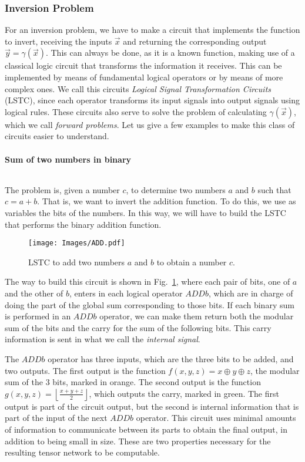 \subsubsection{Inversion Problem}
For an inversion problem, we have to make a circuit that implements the function to invert, receiving the inputs $\vec{x}$ and returning the corresponding output $\vec{y} = \gamma(\vec{x})$. This can always be done, as it is a known function, making use of a classical logic circuit that transforms the information it receives. This can be implemented by means of fundamental logical operators or by means of more complex ones. We call this circuits \textit{Logical Signal Transformation Circuits} (LSTC), since each operator transforms its input signals into output signals using logical rules. These circuits also serve to solve the problem of calculating $\gamma(\vec{x})$, which we call \textit{forward problems}. Let us give a few examples to make this class of circuits easier to understand.

\paragraph{Sum of two numbers in binary}
$ $

The problem is, given a number $c$, to determine two numbers $a$ and $b$ such that $c=a+b$. That is, we want to invert the addition function. To do this, we use as variables the bits of the numbers. In this way, we will have to build the LSTC that performs the binary addition function.
\begin{figure}[h]
    \centering
    \texttt{[image: Images/ADD.pdf]}
    \caption{LSTC to add two numbers $a$ and $b$ to obtain a number $c$.}
    \label{fig: ADD circuit}
\end{figure}

The way to build this circuit is shown in Fig.~\ref{fig: ADD circuit}, where each pair of bits, one of $a$ and the other of $b$, enters in each logical operator $ADDb$, which are in charge of doing the part of the global sum corresponding to those bits. If each binary sum is performed in an $ADDb$ operator, we can make them return both the modular sum of the bits and the carry for the sum of the following bits. This carry information is sent in what we call the \textit{internal signal}.

The $ADDb$ operator has three inputs, which are the three bits to be added, and two outputs. The first output is the function $f(x,y,z) =x\oplus y \oplus z$, the modular sum of the 3 bits, marked in orange. The second output is the function $g(x,y,z)=\left\lfloor\frac{x+y+z}{2}\right\rfloor$, which outputs the carry, marked in green. The first output is part of the circuit output, but the second is internal information that is part of the input of the next $ADDb$ operator.
This circuit uses minimal amounts of information to communicate between its parts to obtain the final output, in addition to being small in size. These are two properties necessary for the resulting tensor network to be computable.


